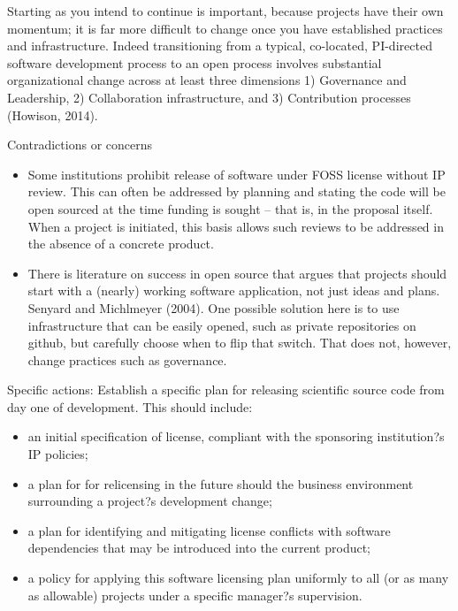\documentclass[a4paper,UKenglish]{dagman}
\begin{document}
Starting as you intend to continue is important, because projects have their own momentum; it is far more difficult to change once you have established practices and infrastructure. Indeed transitioning from a typical, co-located, PI-directed software development process to an open process involves substantial organizational change across at least three dimensions 1) Governance and Leadership, 2) Collaboration infrastructure, and 3) Contribution processes (Howison, 2014).

Contradictions or concerns
\begin{itemize}
\item Some institutions prohibit release of software under FOSS license without IP review. This can often be addressed by planning and stating the code will be open sourced at the time funding is sought -- that is, in the proposal itself. When a project is initiated, this basis allows such reviews to be addressed in the absence of a concrete product.
\item There is literature on success in open source that argues that projects should start with a (nearly) working software application, not just ideas and plans. Senyard and Michlmeyer (2004). One possible solution here is to use infrastructure that can be easily opened, such as private repositories on github, but carefully choose when to flip that switch. That does not, however, change practices such as governance.
\end{itemize}

Specific actions:
Establish a specific plan for releasing scientific source code from day one of development. This should include:
\begin{itemize}
\item an initial specification of license, compliant with the sponsoring institution?s IP policies;
\item a plan for for relicensing in the future should the business environment surrounding a project?s development change;
\item a plan for identifying and mitigating license conflicts with software dependencies that may be introduced into the current product;
\item a policy for applying this software licensing plan uniformly to all (or as many as allowable) projects under a specific manager?s supervision. 
\end{itemize}




\end{document}
